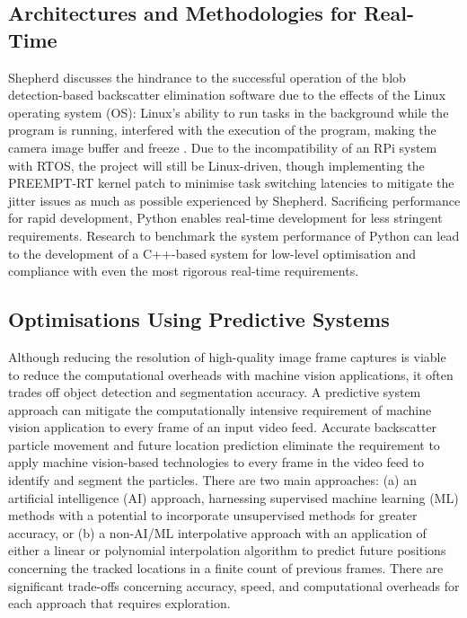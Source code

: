 \subsection{Architectures and Methodologies for Real-Time}
Shepherd discusses the hindrance to the successful operation of the blob detection-based backscatter elimination software due to the effects of the Linux operating system (OS): Linux's ability to run tasks in the background while the program is running, interfered with the execution of the program, making the camera image buffer and freeze \cite{katieshepherdMachineVisionBased2023}. Due to the incompatibility of an RPi system with RTOS, the project will still be Linux-driven, though implementing the PREEMPT-RT kernel patch to minimise task switching latencies to mitigate the jitter issues as much as possible experienced by Shepherd. Sacrificing performance for rapid development, Python enables real-time development for less stringent requirements. Research to benchmark the system performance of Python can lead to the development of a C++-based system for low-level optimisation and compliance with even the most rigorous real-time requirements.

\subsection{Optimisations Using Predictive Systems}
Although reducing the resolution of high-quality image frame captures is viable to reduce the computational overheads with machine vision applications, it often trades off object detection and segmentation accuracy. A predictive system approach can mitigate the computationally intensive requirement of machine vision application to every frame of an input video feed. Accurate backscatter particle movement and future location prediction eliminate the requirement to apply machine vision-based technologies to every frame in the video feed to identify and segment the particles. There are two main approaches: (a) an artificial intelligence (AI) approach, harnessing supervised machine learning (ML) methods with a potential to incorporate unsupervised methods for greater accuracy, or (b) a non-AI/ML interpolative approach with an application of either a linear or polynomial interpolation algorithm to predict future positions concerning the tracked locations in a finite count of previous frames. There are significant trade-offs concerning accuracy, speed, and computational overheads for each approach that requires exploration.
